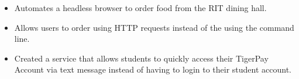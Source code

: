 \documentclass[10pt,a4paper,ragged2e,withhyper]{altacv}
\begin{document}
\begin{paracol}{2}
\begin{itemize}
    
    \end{itemize}

\smallskip \smallskip
  
      
    
  \newline
  \divider

    
    \begin{itemize}
    \item Automates a headless browser to order food from the RIT dining hall.
    \item Allows users to order using HTTP requests instead of the using the command line.

    
    \end{itemize}

\smallskip \smallskip
  
      
     
  \newline
\divider

    
    \begin{itemize}
    
    \item Created a service that allows students to quickly access their TigerPay Account via text message instead of having to login to their student account.
    
    \end{itemize}

\smallskip \smallskip
  
     

\newline


\smallskip \smallskip
       
 

    
    \switchcolumn
    \smallskip
    

    

\end{paracol}
\end{document}
